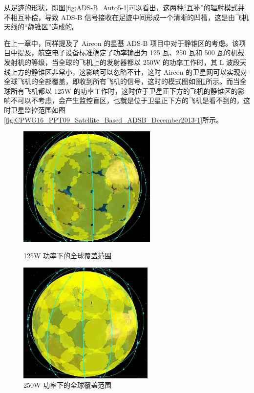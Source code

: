 
从足迹的形状，即图\ref{fig:ADS-B_Auto5-1}可以看出，这两种“互补”的辐射模式并不相互补偿，导致 ADS-B 信号接收在足迹中间形成一个清晰的凹槽，这是由飞机天线的“静锥区”造成的。

在上一章中，同样提及了 Aireon 的星基 ADS-B 项目中对于静锥区的考虑。该项目中提及，航空电子设备标准确定了功率输出为 125 瓦、250 瓦和 500 瓦的机载发射机的等级，当全球的飞机上的发射器都以 250W 的功率工作时，其 L 波段天线上方的静锥区非常小，这影响可以忽略不计，这时 Aireon 的卫星网可以实现对全球飞机的全部覆盖，即收到所有飞机的信号，这时的模式图如图\ref{fig:CPWG16_PPT09_Satellite_Based_ADSB_December2013_1-1}所示。而当全球所有飞机都以 125W 的功率工作时，这时位于卫星正下方的飞机的静锥区的影响不可以不考虑，会产生监控盲区，也就是位于卫星正下方的飞机是看不到的，这时卫星监控范围如图\ref{fig:CPWG16_PPT09_Satellite_Based_ADSB_December2013-1}所示。

\begin{figure}[!htb]
\centering
\begin{minipage}[t]{0.48\textwidth}
\centering
\includegraphics[height=6cm]{pic/CPWG16_PPT09_Satellite_Based_ADSB_December2013.png}
\caption{125W 功率下的全球覆盖范围\protect\footnotemark}
\label{fig:CPWG16_PPT09_Satellite_Based_ADSB_December2013-1}
\end{minipage}
\begin{minipage}[t]{0.48\textwidth}
\centering
\includegraphics[height=6cm]{pic/CPWG16_PPT09_Satellite_Based_ADSB_December2013_1.png
}
\caption{250W 功率下的全球覆盖范围\protect\footnotemark}
\label{fig:CPWG16_PPT09_Satellite_Based_ADSB_December2013_1-1}
\end{minipage}
\end{figure}

